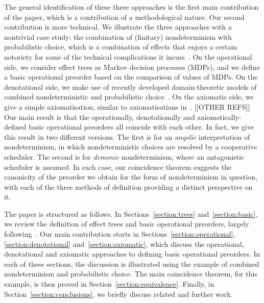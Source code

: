The general identification of these three approaches is the first main contribution of the paper, which is a contribution of a methodological nature. Our second contribution is more technical. We illustrate the three approaches
with a nontrivial case study: the combination of (finitary) nondeterminism with probabilistic choice, which is a combination of effects that enjoys a certain notoriety 
for some of the technical complications it incurs~\cite{Mislove2000,mislove2004axioms,VW06,tix2009semantic,JGL15,JGL-mscs16,KeimelP2016}.
On the operational side, we consider effect trees as Markov decision processes (MDPs), and we define a basic operational preorder based on the comparison of values of MDPs. On the denotational side, we make use of recently developed domain-theoretic models of combined nondeterministic and probabilistic choice~\cite{tix2009semantic,JGL-mscs16,KeimelP2016}.
On the axiomatic side, we give a simple axiomatisation, similar to axiomatisations in~\cite{KeimelP2016}. [[OTHER REFS]]
Our main result is that the
operationally, denotationally and axiomatically-defined basic operational preorders all coincide with each other.
In fact, we give this result in two different versions.
The first is for an \emph{angelic} interpretation of nondeterminism, in which nondeterministic choices are resolved by a cooperative scheduler. The second is for \emph{demonic} nondeterminism, where an antagonistic scheduler is assumed. 
In each case, our coincidence theorem suggests the canonicity of the  preorder we obtain for the form of nondeterminism in question, with each of the three methods of definition providing a distinct perspective on it. 

The paper is structured as follows. In Sections~\ref{section:trees} and~\ref{section:basic}, we review the 
definition of effect trees and basic operational preorders, largely following~\cite{gom}. Our main contribution starts in Sections~\ref{section:operational}, \ref{section:denotational} and~\ref{section:axiomatic}, which discuss the 
operational, denotational and axiomatic approaches to defining basic operational preorders. In each of these sections, the discussion is illustrated using the example of combined nondeterminism and probabilistic choice. 
The main coincidence theorem, for this example, is then proved in Section~\ref{section:equivalence}. Finally, in Section~\ref{section:conclusions}, we briefly discuss related and further work.






